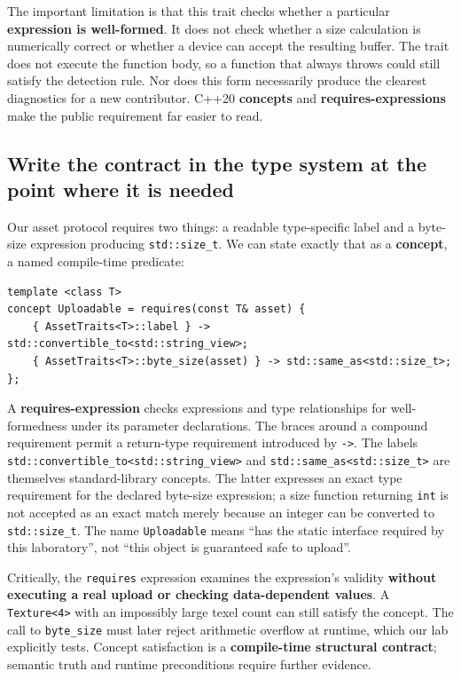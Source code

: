 The important limitation is that this trait checks whether a particular \textbf{expression is well-formed}. It does not check whether a size calculation is numerically correct or whether a device can accept the resulting buffer. The trait does not execute the function body, so a function that always throws could still satisfy the detection rule. Nor does this form necessarily produce the clearest diagnostics for a new contributor. C++20 \textbf{concepts} and \textbf{requires-expressions} make the public requirement far easier to read.

\subsection{Write the contract in the type system at the point where it is needed}\label{01-foundations-i-ch005-write-the-contract-in-the-type-system-at-the-point-where-it-is-needed}

Our asset protocol requires two things: a readable type-specific label and a byte-size expression producing \texttt{std::size\_t}. We can state exactly that as a \textbf{concept}, a named compile-time predicate:

\begin{verbatim}
template <class T>
concept Uploadable = requires(const T& asset) {
    { AssetTraits<T>::label } -> std::convertible_to<std::string_view>;
    { AssetTraits<T>::byte_size(asset) } -> std::same_as<std::size_t>;
};
\end{verbatim}

A \textbf{requires-expression} checks expressions and type relationships for well-formedness under its parameter declarations. The braces around a compound requirement permit a return-type requirement introduced by \texttt{-\textgreater{}}. The labels \texttt{std::convertible\_to\textless{}std::string\_view\textgreater{}} and \texttt{std::same\_as\textless{}std::size\_t\textgreater{}} are themselves standard-library concepts. The latter expresses an exact type requirement for the declared byte-size expression; a size function returning \texttt{int} is not accepted as an exact match merely because an integer can be converted to \texttt{std::size\_t}. The name \texttt{Uploadable} means ``has the static interface required by this laboratory'', not ``this object is guaranteed safe to upload''.

Critically, the \texttt{requires} expression examines the expression's validity \textbf{without executing a real upload or checking data-dependent values}. A \texttt{Texture\textless{}4\textgreater{}} with an impossibly large texel count can still satisfy the concept. The call to \texttt{byte\_size} must later reject arithmetic overflow at runtime, which our lab explicitly tests. Concept satisfaction is a \textbf{compile-time structural contract}; semantic truth and runtime preconditions require further evidence.

